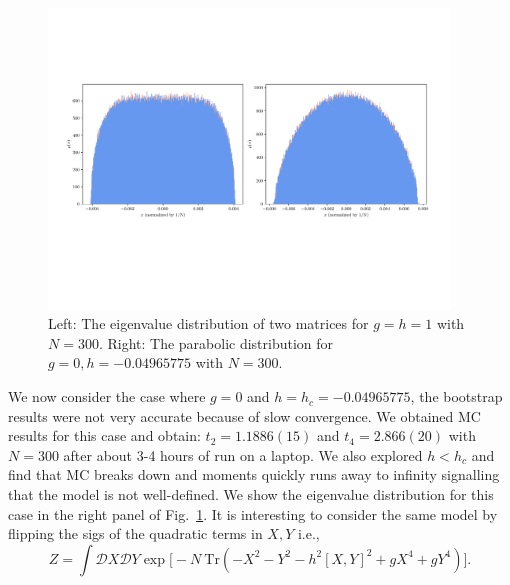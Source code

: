\documentclass[letter,11pt]{article}
\begin{document}
\begin{figure}[htbp] 
	\centering 
	\includegraphics[width=0.95\textwidth]{figs/plot_2MM_evd_both.pdf}
	\caption{\label{fig:2MM_match1}Left: The eigenvalue distribution of two matrices for $g=h=1$ with $N=300$.
	Right: The parabolic distribution for $g = 0, h = -0.04965775$ with $N=300$.}
\end{figure}
We now consider the case where $g=0$ and $h = h_{c}=-0.04965775$, the bootstrap results were not very accurate because of slow convergence. We obtained MC results for this case 
and obtain: $t_{2} = 1.1886(15)$ and $t_{4}=2.866(20)$ with $N=300$ after about 3-4 hours of run on a 
laptop. We also explored $h < h_{c}$ and find that MC breaks down and moments quickly runs away to infinity
signalling that the model is not well-defined. We show the eigenvalue distribution for this case in the right panel of Fig.~\ref{fig:2MM_match1}. 
It is interesting to consider the same model by flipping the sigs of the quadratic terms in $X,Y$ i.e., 
\begin{equation}
\label{eq:GHM2} 
Z = \int \mathcal{D}X \mathcal{D}Y \exp \Big[-N ~ \mbox{Tr} (-X^2  -Y^2 - h^2 [X,Y]^2 + gX^4 + gY^4) \Big].	
\end{equation} 
\end{document}

